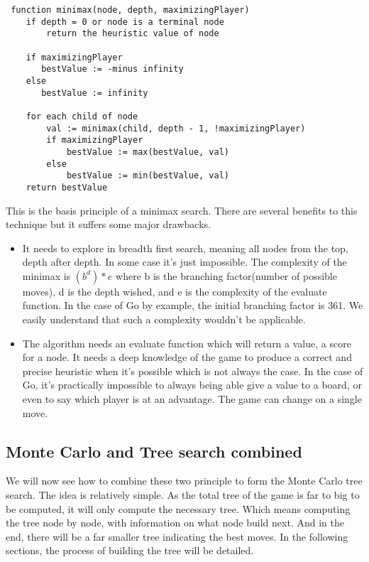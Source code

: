  \begin{verbatim}
 function minimax(node, depth, maximizingPlayer)
    if depth = 0 or node is a terminal node
        return the heuristic value of node
    
    if maximizingPlayer
       bestValue := -minus infinity
    else
       bestValue := infinity
    
    for each child of node
        val := minimax(child, depth - 1, !maximizingPlayer)
        if maximizingPlayer
            bestValue := max(bestValue, val)
        else
            bestValue := min(bestValue, val)
    return bestValue
 \end{verbatim}
 
 This is the basis principle of a minimax search. There are several benefits to this technique but it suffers some major drawbacks. 
 
 \begin{itemize}
 \item It needs to explore in breadth first search, meaning all nodes from the top, depth after depth. In some case it's just impossible. The complexity of the minimax is $(b^d)*e$ where b is the branching factor(number of possible moves), d is the depth wished, and e is the complexity of the evaluate function. In the case of Go by example, the initial branching factor is 361. We easily understand that such a complexity wouldn't be applicable.
 \item The algorithm needs an evaluate function which will return a value, a score for a node. It needs a deep knowledge of the game to produce a correct and precise heuristic when it's possible which is not always the case. In the case of Go, it's practically impossible to always being able give a value to a board, or even to say which player is at an advantage. The game can change on a single move. 
 \end{itemize}

\subsection{Monte Carlo and Tree search combined}

We will now see how to combine these two principle to form the Monte Carlo tree search. The idea is relatively simple. As the total tree of the game is far to big to be computed, it will only compute the necessary tree. Which means computing the tree node by node, with information on what node build next. And in the end, there will be a far smaller tree indicating the best moves. In the following sections, the process of building the tree will be detailed. 

